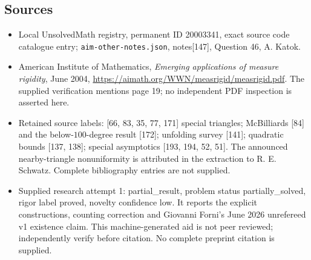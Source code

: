\documentclass[11pt]{article}
\begin{document}
\subsection{Sources}
\begin{itemize}
\item Local UnsolvedMath registry, permanent ID 20003341, exact source code catalogue entry; \texttt{aim-other-notes.json}, notes[147], Question 46, A. Katok.
\item American Institute of Mathematics, \emph{Emerging applications of measure rigidity}, June 2004, \url{https://aimath.org/WWN/measrigid/measrigid.pdf}. The supplied verification mentions page 19; no independent PDF inspection is asserted here.
\item Retained source labels: [66, 83, 35, 77, 171] special triangles; McBilliards [84] and the below-$100$-degree result [172]; unfolding survey [141]; quadratic bounds [137, 138]; special asymptotics [193, 194, 52, 51]. The announced nearby-triangle nonuniformity is attributed in the extraction to R. E. Schwatz. Complete bibliography entries are not supplied.
\item Supplied research attempt 1: partial\_result, problem status partially\_solved, rigor label proved, novelty confidence low. It reports the explicit constructions, counting correction and Giovanni Forni's June 2026 unrefereed v1 existence claim. This machine-generated aid is not peer reviewed; independently verify before citation. No complete preprint citation is supplied.
\end{itemize}
\end{document}

